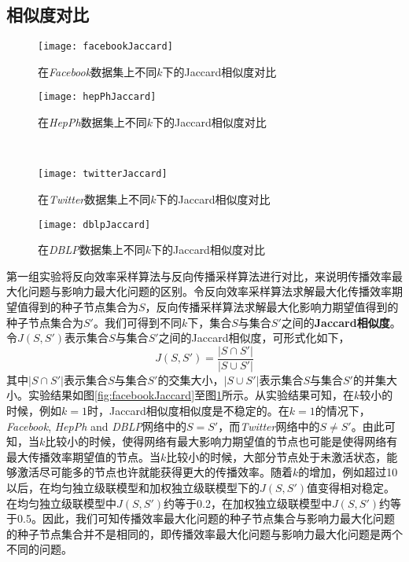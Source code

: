\subsection{相似度对比}
\label{subsec4:compare}
\begin{figure}[ht]
   \begin{minipage}{0.48\textwidth}
     \centering
     \texttt{[image: facebookJaccard]}
     \caption{在\textit{Facebook}数据集上不同$k$下的Jaccard相似度对比}
     \label{fig:facebookJaccard}
   \end{minipage}
   \hfill
   \begin {minipage}{0.48\textwidth}
     \centering
     \texttt{[image: hepPhJaccard]}
     \caption{在\textit{HepPh}数据集上不同$k$下的Jaccard相似度对比}
     \label{fig:hepPhJaccard}
   \end{minipage}
   \\
   \begin{minipage}{0.48\textwidth}
     \centering
     \texttt{[image: twitterJaccard]}
     \caption{在\textit{Twitter}数据集上不同$k$下的Jaccard相似度对比}
     \label{fig:twitterJaccard}
   \end{minipage}
   \hfill
   \begin {minipage}{0.48\textwidth}
     \centering
     \texttt{[image: dblpJaccard]}
     \caption{在\textit{DBLP}数据集上不同$k$下的Jaccard相似度对比}
     \label{fig:dblpJaccard}
   \end{minipage}
\end{figure}

第一组实验将反向效率采样算法与反向传播采样算法进行对比，来说明传播效率最大化问题与影响力最大化问题的区别。令反向效率采样算法求解最大化传播效率期望值得到的种子节点集合为$S$，反向传播采样算法求解最大化影响力期望值得到的种子节点集合为$S'$。我们可得到不同$k$下，集合$S$与集合$S'$之间的\textbf{Jaccard相似度}。令$J(S,S')$表示集合$S$与集合$S'$之间的Jaccard相似度，可形式化如下，
\begin{equation}\label{eq:jaccard}
    J(S,S') = \frac{\vert S \cap S' \vert}{\vert S \cup S' \vert}
\end{equation}
其中$\vert S \cap S' \vert$表示集合$S$与集合$S'$的交集大小，$\vert S \cup S' \vert$表示集合$S$与集合$S'$的并集大小。实验结果如图\ref{fig:facebookJaccard}至图\ref{fig:dblpJaccard}所示。从实验结果可知，在$k$较小的时候，例如$k=1$时，Jaccard相似度相似度是不稳定的。在$k=1$的情况下，\textit{Facebook}, \textit{HepPh} and \textit{DBLP}网络中的$S=S'$，而\textit{Twitter}网络中的$S \neq S'$。由此可知，当$k$比较小的时候，使得网络有最大影响力期望值的节点也可能是使得网络有最大传播效率期望值的节点。当$k$比较小的时候，大部分节点处于未激活状态，能够激活尽可能多的节点也许就能获得更大的传播效率。随着$k$的增加，例如超过10以后，在均匀独立级联模型和加权独立级联模型下的$J(S,S')$值变得相对稳定。在均匀独立级联模型中$J(S,S')$约等于0.2，在加权独立级联模型中$J(S,S')$约等于0.5。因此，我们可知传播效率最大化问题的种子节点集合与影响力最大化问题的种子节点集合并不是相同的，即传播效率最大化问题与影响力最大化问题是两个不同的问题。

